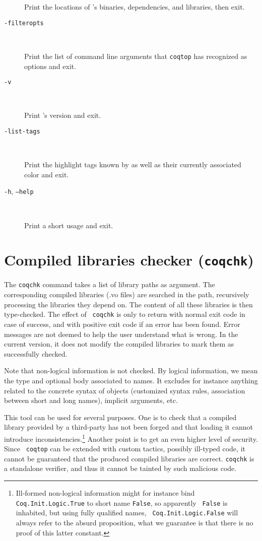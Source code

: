\begin{description}
  Print the locations of \Coq's binaries, dependencies, and libraries, then exit.

\item[{\tt -filteropts}]\ %

  Print the list of command line arguments that {\tt coqtop} has
  recognized as options and exit.

\item[{\tt -v}]\ %

  Print \Coq's version and exit.

\item[{\tt -list-tags}]\ %

  Print the highlight tags known by {\Coq} as well as their currently associated
  color and exit.

\item[{\tt -h}, {\tt --help}]\ %

  Print a short usage and exit.

\end{description}


\section{Compiled libraries checker ({\tt coqchk})}

The {\tt coqchk} command takes a list of library paths as argument.
The corresponding compiled libraries (.vo files) are searched in the
path, recursively processing the libraries they depend on. The content
of all these libraries is then type-checked. The effect of {\tt
  coqchk} is only to return with normal exit code in case of success,
and with positive exit code if an error has been found. Error messages
are not deemed to help the user understand what is wrong. In the
current version, it does not modify the compiled libraries to mark
them as successfully checked.

Note that non-logical information is not checked. By logical
information, we mean the type and optional body associated to names.
It excludes for instance anything related to the concrete syntax of
objects (customized syntax rules, association between short and long
names), implicit arguments, etc.

This tool can be used for several purposes. One is to check that a
compiled library provided by a third-party has not been forged and
that loading it cannot introduce inconsistencies.\footnote{Ill-formed
  non-logical information might for instance bind {\tt
    Coq.Init.Logic.True} to short name {\tt False}, so apparently {\tt
    False} is inhabited, but using fully qualified names, {\tt
    Coq.Init.Logic.False} will always refer to the absurd proposition,
  what we guarantee is that there is no proof of this latter
  constant.}
Another point is to get an even higher level of security. Since {\tt
  coqtop} can be extended with custom tactics, possibly ill-typed
code, it cannot be guaranteed that the produced compiled libraries are
correct. {\tt coqchk} is a standalone verifier, and thus it cannot be
tainted by such malicious code.

